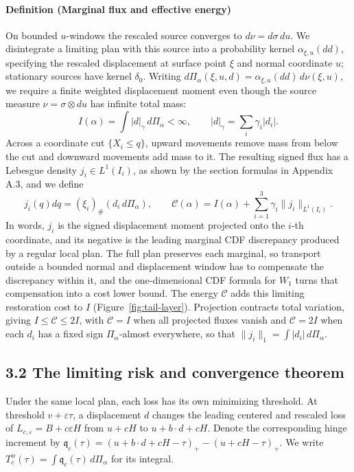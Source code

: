 \paragraph{Definition (Marginal flux and effective energy)} On bounded \(u\)-windows the rescaled source converges to \(d\nu=d\sigma\,du\). We disintegrate a limiting plan with this source into a probability kernel \(\alpha_{\xi,u}(dd)\), specifying the rescaled displacement at surface point \(\xi\) and normal coordinate \(u\); stationary sources have kernel \(\delta_0\). Writing \(d\Pi_\alpha(\xi,u,d)=\alpha_{\xi,u}(dd)\,d\nu(\xi,u)\), we require a finite weighted displacement moment even though the source measure \(\nu=\sigma\otimes du\) has infinite total mass:
\[
I(\alpha)=\int|d|_\gamma\,d\Pi_\alpha<\infty,
\qquad |d|_\gamma=\sum_i\gamma_i|d_i|.
\]
Across a coordinate cut \(\{X_i\le q\}\), upward movements remove mass from below the cut and downward movements add mass to it. The resulting signed flux has a Lebesgue density \(j_i\in L^1(I_i)\), as shown by the section formulas in Appendix A.3, and we define
\begin{equation}
j_i(q)dq=(\xi_i)_\#(d_i\,d\Pi_\alpha),\qquad
\mathcal C(\alpha)=I(\alpha)+\sum_{i=1}^3\gamma_i\|j_i\|_{L^1(I_i)}.
\tag{3.1}\label{eq:3.1}
\end{equation}
In words, \(j_i\) is the signed displacement moment projected onto the \(i\)-th coordinate, and its negative is the leading marginal CDF discrepancy produced by a regular local plan. The full plan preserves each marginal, so transport outside a bounded normal and displacement window has to compensate the discrepancy within it, and the one-dimensional CDF formula for \(W_1\) \cite{vallender1974} turns that compensation into a cost lower bound. The energy \(\mathcal C\) adds this limiting restoration cost to \(I\) (Figure~\ref{fig:tail-layer}). Projection contracts total variation, giving \(I\le\mathcal C\le2I\), with \(\mathcal C=I\) when all projected fluxes vanish and \(\mathcal C=2I\) when each \(d_i\) has a fixed sign \(\Pi_\alpha\)-almost everywhere, so that \(\|j_i\|_1=\int|d_i|\,d\Pi_\alpha\).



\subsection{3.2 The limiting risk and convergence theorem}\label{sec:limit-risk}
Under the same local plan, each loss has its own minimizing threshold. At threshold \(v+\varepsilon\tau\), a displacement \(d\) changes the leading centered and rescaled loss of \(L_{c,\varepsilon}=B+c\varepsilon H\) from \(u+cH\) to \(u+b\cdot d+cH\). Denote the corresponding hinge increment by \(\mathfrak q_c(\tau)=(u+b\cdot d+cH-\tau)_+-(u+cH-\tau)_+\). We write \(T_c^\alpha(\tau)=\int\mathfrak q_c(\tau)\,d\Pi_\alpha\) for its integral.

